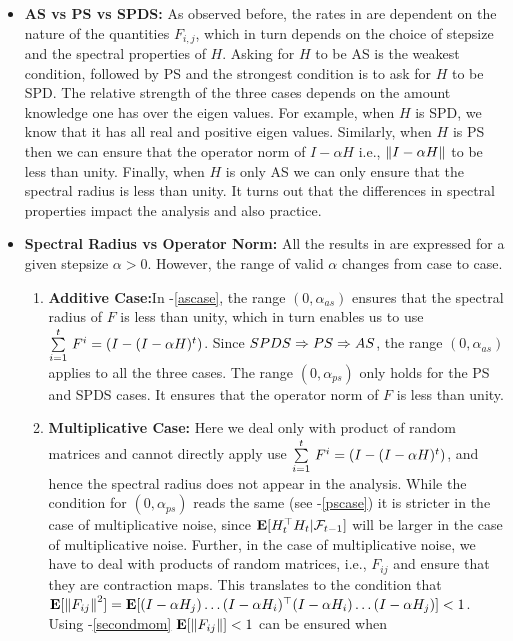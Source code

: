\begin{itemize}[leftmargin=*]
\item \textbf{AS vs PS vs SPDS:} As observed before, the rates in  are dependent on the nature of the quantities $F_{i,j}$, which in turn depends on the choice of stepsize and the spectral properties of $H$. Asking for $H$ to be AS is the weakest condition, followed by PS and the strongest condition is to ask for $H$ to be SPD. The relative strength of the three cases depends on the amount knowledge one has over the eigen values. For example, when $H$ is SPD, we know that it has all real and positive eigen values. Similarly, when $H$ is PS then we can ensure that the operator norm of $I-\alpha H$ i.e., $\norm{I-\alpha H}$ to be less than unity. Finally, when $H$ is only AS we can only ensure that the spectral radius is less than unity. It turns out that the differences in spectral properties impact the analysis and also practice.
\item \textbf{Spectral  Radius vs Operator Norm:} All the results in  are expressed for a given stepsize $\alpha>0$. However, the range of valid $\alpha$ changes from case to case.
\begin{enumerate}
\item \textbf{Additive Case:}In -\ref{ascase}, the range $(0,\alpha_{as})$ ensures that the spectral radius of $F$ is less than unity, which in turn enables us to use $\ous{\sum}{i=1}{t}F^{i}=(I-(I-\alpha H)^t)$. Since $SPDS \Ra PS \Ra AS$, the range $(0,\alpha_{as})$ applies to all the three cases. The range $(0,\alpha_{ps})$ only holds for the PS and SPDS cases. It ensures that the operator norm of $F$ is less than unity.
\item \textbf{Multiplicative Case:} Here we deal only with product of random matrices and cannot directly apply use  $\ous{\sum}{i=1}{t}F^{i}=(I-(I-\alpha H)^t)$, and hence the spectral radius does not appear in the analysis. While the condition for $(0,\alpha_{ps})$ reads the same (see -\ref{pscase}) it is stricter in the case of multiplicative noise, since $\E[H^\top_t H_t|\F_{t-1}]$ will be larger in the case of multiplicative noise.  Further, in the case of multiplicative noise, we have to deal with products of random matrices, i.e., $F_{ij}$ and ensure that they are contraction maps. This translates to the condition that $\E[\norm{F_{ij}}^2]= \E[(I-\alpha H_j)\ldots (I-\alpha H_i)^\top (I-\alpha H_i) \ldots (I-\alpha H_j)]<1$. Using -\ref{secondmom}  $\E[\norm{F_{ij}}]<1$ can be ensured when
\begin{align}\label{mulcond}

\end{align}
\end{enumerate}
\end{itemize}
